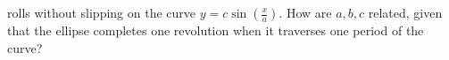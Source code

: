 rolls without slipping on the curve $y = c \sin \left( \frac{x}{a}
\right)$. How are $a,b,c$ related, given that the ellipse completes
one revolution when it traverses one period of the curve?

